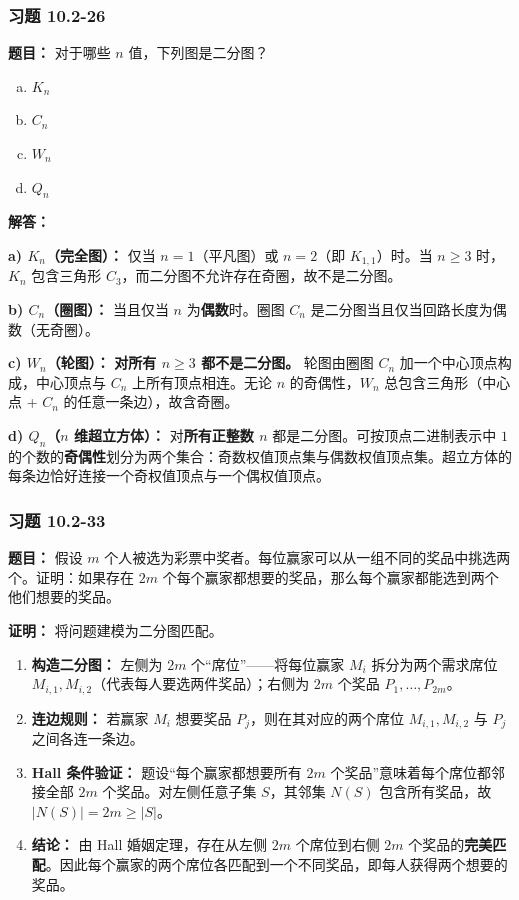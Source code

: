\documentclass[11pt,UTF8]{article}
\begin{document}
\subsubsection*{习题 10.2-26}
\textbf{题目：} 对于哪些 $n$ 值，下列图是二分图？
\begin{enumerate}[a)]
    \item $K_n$
    \item $C_n$
    \item $W_n$
    \item $Q_n$
\end{enumerate}

\textbf{解答：}

\textbf{a) $K_n$（完全图）：}
仅当 $n=1$（平凡图）或 $n=2$（即 $K_{1,1}$）时。当 $n \ge 3$ 时，$K_n$ 包含三角形 $C_3$，而二分图不允许存在奇圈，故不是二分图。

\textbf{b) $C_n$（圈图）：}
当且仅当 $n$ 为\textbf{偶数}时。圈图 $C_n$ 是二分图当且仅当回路长度为偶数（无奇圈）。

\textbf{c) $W_n$（轮图）：}
\textbf{对所有 $n \ge 3$ 都不是二分图。} 轮图由圈图 $C_n$ 加一个中心顶点构成，中心顶点与 $C_n$ 上所有顶点相连。无论 $n$ 的奇偶性，$W_n$ 总包含三角形（中心点 + $C_n$ 的任意一条边），故含奇圈。

\textbf{d) $Q_n$（$n$ 维超立方体）：}
对\textbf{所有正整数 $n$} 都是二分图。可按顶点二进制表示中 $1$ 的个数的\textbf{奇偶性}划分为两个集合：奇数权值顶点集与偶数权值顶点集。超立方体的每条边恰好连接一个奇权值顶点与一个偶权值顶点。

\subsubsection*{习题 10.2-33}
\textbf{题目：} 假设 $m$ 个人被选为彩票中奖者。每位赢家可以从一组不同的奖品中挑选两个。证明：如果存在 $2m$ 个每个赢家都想要的奖品，那么每个赢家都能选到两个他们想要的奖品。

\textbf{证明：} 将问题建模为二分图匹配。
\begin{enumerate}[1.]
    \item \textbf{构造二分图：} 左侧为 $2m$ 个``席位''——将每位赢家 $M_i$ 拆分为两个需求席位 $M_{i,1}, M_{i,2}$（代表每人要选两件奖品）；右侧为 $2m$ 个奖品 $P_1,\dots,P_{2m}$。
    \item \textbf{连边规则：} 若赢家 $M_i$ 想要奖品 $P_j$，则在其对应的两个席位 $M_{i,1}, M_{i,2}$ 与 $P_j$ 之间各连一条边。
    \item \textbf{Hall 条件验证：} 题设``每个赢家都想要所有 $2m$ 个奖品''意味着每个席位都邻接全部 $2m$ 个奖品。对左侧任意子集 $S$，其邻集 $N(S)$ 包含所有奖品，故 $|N(S)| = 2m \ge |S|$。
    \item \textbf{结论：} 由 Hall 婚姻定理，存在从左侧 $2m$ 个席位到右侧 $2m$ 个奖品的\textbf{完美匹配}。因此每个赢家的两个席位各匹配到一个不同奖品，即每人获得两个想要的奖品。
\end{enumerate}
\end{document}
